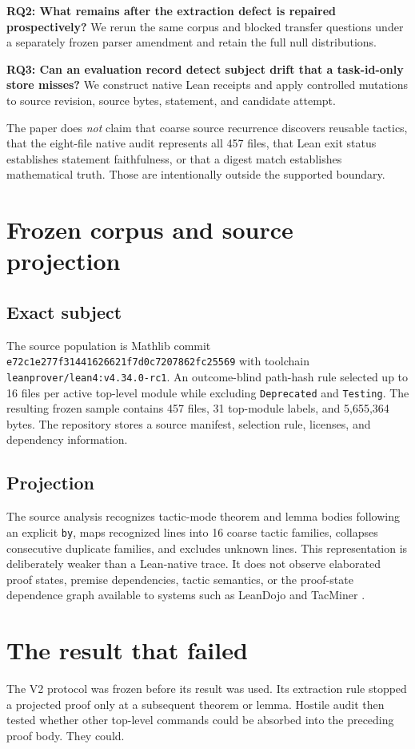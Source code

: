 \documentclass[11pt]{article}
\begin{document}
\textbf{RQ2: What remains after the extraction defect is repaired prospectively?} We rerun the same corpus and blocked transfer questions under a separately frozen parser amendment and retain the full null distributions.

\textbf{RQ3: Can an evaluation record detect subject drift that a task-id-only store misses?} We construct native Lean receipts and apply controlled mutations to source revision, source bytes, statement, and candidate attempt.

The paper does \emph{not} claim that coarse source recurrence discovers reusable tactics, that the eight-file native audit represents all 457 files, that Lean exit status establishes statement faithfulness, or that a digest match establishes mathematical truth. Those are intentionally outside the supported boundary.

\section{Frozen corpus and source projection}
\subsection{Exact subject}
The source population is Mathlib commit \texttt{e72c1e277f31441626621f7d0c7207862fc25569} with toolchain \texttt{leanprover/lean4:v4.34.0-rc1}. An outcome-blind path-hash rule selected up to 16 files per active top-level module while excluding \texttt{Deprecated} and \texttt{Testing}. The resulting frozen sample contains 457 files, 31 top-module labels, and 5,655,364 bytes. The repository stores a source manifest, selection rule, licenses, and dependency information.

\subsection{Projection}
The source analysis recognizes tactic-mode theorem and lemma bodies following an explicit \texttt{by}, maps recognized lines into 16 coarse tactic families, collapses consecutive duplicate families, and excludes unknown lines. This representation is deliberately weaker than a Lean-native trace. It does not observe elaborated proof states, premise dependencies, tactic semantics, or the proof-state dependence graph available to systems such as LeanDojo and TacMiner \cite{yang2023leandojo,xin2025tacminer}.

\section{The result that failed}
The V2 protocol was frozen before its result was used. Its extraction rule stopped a projected proof only at a subsequent theorem or lemma. Hostile audit then tested whether other top-level commands could be absorbed into the preceding proof body. They could.
\end{document}
